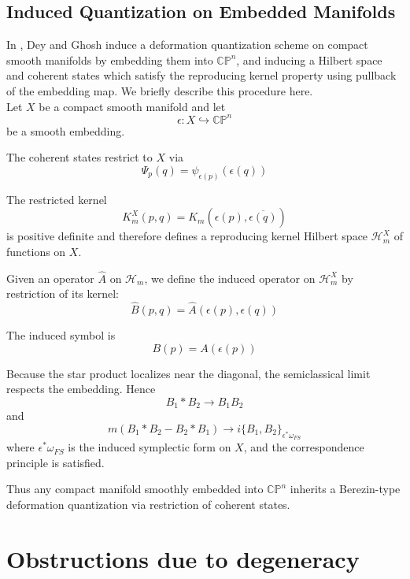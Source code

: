\documentclass[
  12pt,
  a4paper, oneside
]{report}
\theoremstyle{bolddef}
\theoremstyle{remark}
\numberwithin{equation}{chapter}
\begin{document}
\subsection{Induced Quantization on Embedded Manifolds}
In \cite{deyghosh-induceddq,Rawnsley1977}, Dey and Ghosh induce a deformation quantization scheme on compact smooth manifolds by embedding them into $\mathbb{CP}^{n}$, and inducing a Hilbert space and coherent states which satisfy the reproducing kernel property using pullback of the embedding map. We briefly describe this procedure here. \\ 
Let $X$ be a compact smooth manifold
and let
$$
\epsilon: X \hookrightarrow \mathbb{CP}^n
$$
be a smooth embedding.

The coherent states restrict to $X$ via
$$
\Psi_p(q)
=
\psi_{\epsilon(p)}(\epsilon(q))
$$

The restricted kernel
$$
K_m^X(p,q)
=
K_m(\epsilon(p),\overline{\epsilon(q)})
$$
is positive definite and therefore defines
a reproducing kernel Hilbert space
$\mathcal H_m^X$ of functions on $X$.

Given an operator $\hat A$ on $\mathcal H_m$,
we define the induced operator on $\mathcal H_m^X$
by restriction of its kernel:
$$
\hat B(p,q)
=
\hat A(\epsilon(p),\epsilon(q))
$$

The induced symbol is
$$
B(p)
=
A(\epsilon(p))
$$

Because the star product localizes near the diagonal,
the semiclassical limit respects the embedding.
Hence
$$
B_1 * B_2 \to B_1 B_2
$$
and
$$
m(B_1*B_2 - B_2*B_1)
\to i\{B_1,B_2\}_{\epsilon^*\omega_{FS}}
$$
where $\epsilon^*\omega_{FS}$ is the induced symplectic form on $X$, and the correspondence principle is satisfied.

\medskip

Thus any compact manifold smoothly embedded into
$\mathbb{CP}^n$ inherits a Berezin-type
deformation quantization via restriction
of coherent states.
\bigskip

\section{Obstructions due to degeneracy}
\end{document}
